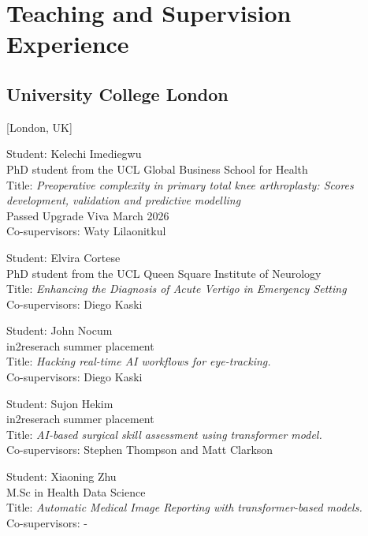 \documentclass{mycv}
\begin{document}
\section{Teaching and Supervision Experience}

\subsection{University College London}[London, UK]
\vspace{1mm}

\begin{positions}
\end{positions}

Student: Kelechi Imediegwu  \\
PhD student from the UCL Global Business School for Health \\
Title: \textit{Preoperative complexity in primary total knee arthroplasty:
Scores development, validation and predictive modelling}  \\
Passed Upgrade Viva March 2026 \\
Co-supervisors: Waty Lilaonitkul

Student: Elvira Cortese  \\
PhD student from the UCL Queen Square Institute of Neurology \\
Title: \textit{Enhancing the Diagnosis of Acute Vertigo in Emergency Setting}  \\
Co-supervisors: Diego Kaski

Student: John Nocum  \\
in2reserach summer placement \\
Title: \textit{Hacking real-time AI workflows for eye-tracking.}  \\
Co-supervisors: Diego Kaski

Student: Sujon Hekim  \\
in2reserach summer placement \\
Title: \textit{AI-based surgical skill assessment using transformer model.}  \\
Co-supervisors: Stephen	Thompson and Matt Clarkson


Student: Xiaoning Zhu  \\
M.Sc in Health Data Science\\
Title: \textit{Automatic Medical Image Reporting with transformer-based models.}  \\
Co-supervisors: -
\end{document}
